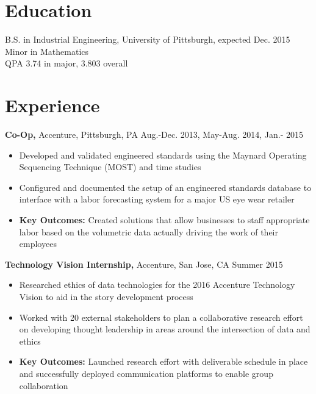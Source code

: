 \documentclass[margin]{res}
\begin{document}
 
 
\begin{flushleft}

\textbf{\Huge{Harrison Lynch}} \\
\large{hal53@pitt.edu \vspace{6.5mm} \\
\rule{132mm}{0.2}
\vspace{-16mm}


\end{flushleft}

\begin{resume} 
 

\section{Education} 
B.S. in Industrial Engineering, University of Pittsburgh, expected Dec. 2015 \\
Minor in Mathematics \\
QPA 3.74 in major, 3.803 overall

 
\section{Experience}
 {\bf Co-Op,} Accenture, Pittsburgh, PA \hfill Aug.-Dec. 2013, May-Aug. 2014, Jan.- 2015
 \begin{itemize} \itemsep -2pt  %
 \item Developed and validated engineered standards using the Maynard Operating Sequencing Technique (MOST) and time studies
 \item Configured and documented the setup of an engineered standards database to interface with a labor forecasting system for a major US eye wear retailer
 \item \textbf{Key Outcomes:} Created solutions that allow businesses to staff appropriate labor based on the volumetric data actually driving the work of their employees
 \end{itemize}

{\bf Technology Vision Internship,} Accenture, San Jose, CA \hfill  Summer 2015
\begin{itemize} \itemsep -2pt %
\item Researched ethics of data technologies for the 2016 Accenture Technology Vision to aid in the story development process
\item Worked with 20 external stakeholders to plan a collaborative research effort on developing thought leadership in areas around the intersection of data and ethics
\item \textbf{Key Outcomes:} Launched research effort with deliverable schedule in place and successfully deployed communication platforms to enable group collaboration
\end{itemize}


\end{resume}
\end{document}
